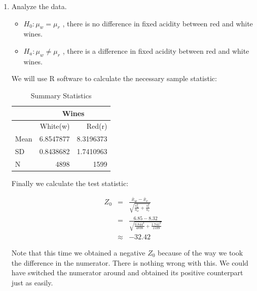 \documentclass[11pt, chapterprefix=true]{scrbook}\usepackage[]{graphicx}\usepackage[]{color}
\begin{document}
\begin{enumerate}
\begin{itemize}
  \end{itemize}
  
\item Analyze the data.

  \begin{itemize}
  \item $H_0: \mu_w = \mu_r$ ,    there is no difference in fixed acidity between red and white wines. 
  \item $H_a: \mu_w \ne \mu_r$ ,  there is a difference in fixed acidity between red and white wines. 
  \end{itemize}
  
  We will use R software to calculate the necessary sample statistic:
 
\begin{table}[htbp]
   \centering
   \caption{Summary Statistics}
   \begin{tabular}{@{} lrr @{}}  \hline %
      & \multicolumn{2}{c}{Wines } \\
      \hline 
          & White(w)  & Red(r)  \\ \hline
      Mean & 6.8547877 & 8.3196373 \\
      SD   & 0.8438682 & 1.7410963 \\
      N    & 4898  & 1599  \\ \hline
   \end{tabular}
   
   \label{tab:tbwines}
\end{table} 

Finally we calculate the test statistic:

  \begin{eqnarray*}
  Z_0 &=& \frac{ \bar{x}_w - \bar{x}_r}{ \sqrt{ \frac{s_w^2}{n_w} + \frac{s_r^2}{n_r}}} \\
    &=& \frac{ 6.85 - 8.32 }{ \sqrt{ \frac{0.844^2 }{4898} + \frac{1.741^2}{1599}}} \\
    &\approx& -32.42 
   \end{eqnarray*} 
   
Note that this time we obtained a negative $Z_0$ because of the way we took the difference in the numerator. There is nothing wrong with this. We could have switched the numerator around and obtained its positive counterpart just as easily.


\end{enumerate}
\end{document}
